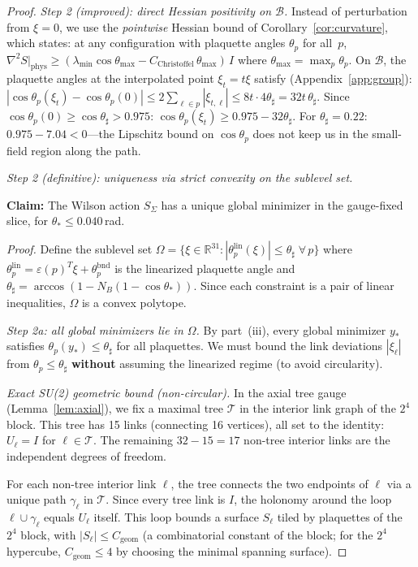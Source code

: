 \documentclass[11pt]{article}
\theoremstyle{definition}
\newcommand{\R}{\mathbb{R}}
\begin{document}
\begin{proof}
\emph{Step 2 (improved): direct Hessian positivity on $\mathcal{B}$.}
Instead of perturbation from $\xi=0$, we use the
\emph{pointwise} Hessian bound of Corollary~\ref{cor:curvature},
which states: at any configuration with plaquette angles
$\theta_p$ for all~$p$,
$\nabla^2 S|_{\mathrm{phys}}
\ge(\lambda_{\min}\cos\theta_{\max}
-C_{\mathrm{Christoffel}}\,\theta_{\max})\,I$
where $\theta_{\max}=\max_p\theta_p$.
On $\mathcal{B}$, the plaquette angles at the interpolated point
$\xi_t=t\xi$ satisfy (Appendix~\ref{app:group}):
$|\cos\theta_p(\xi_t)-\cos\theta_p(0)|
\le 2\sum_{\ell\in p}|\xi_{t,\ell}|
\le 8t\cdot 4\theta_\sharp=32t\,\theta_\sharp$.
Since $\cos\theta_p(0)\ge\cos\theta_\sharp>0.975$:
$\cos\theta_p(\xi_t)\ge 0.975-32\theta_\sharp$.
For $\theta_\sharp=0.22$: $0.975-7.04<0$---the Lipschitz bound on
$\cos\theta_p$ does not keep us in the small-field region
along the path.

\emph{Step 2 (definitive): uniqueness via strict convexity
on the sublevel set.}

\textbf{Claim:} The Wilson action $S_\Sigma$ has a unique
global minimizer in the gauge-fixed slice, for
$\theta_*\le 0.040$\,rad.

\textit{Proof.}
Define the sublevel set
$\Omega=\{\xi\in\R^{31}:|\theta_p^{\mathrm{lin}}(\xi)|
\le\theta_\sharp\;\forall\,p\}$
where $\theta_p^{\mathrm{lin}}=\varepsilon(p)^T\xi+\theta_p^{\mathrm{bnd}}$
is the linearized plaquette angle and
$\theta_\sharp=\arccos(1-N_B(1-\cos\theta_*))$.
Since each constraint is a pair of linear inequalities,
$\Omega$ is a convex polytope.

\emph{Step 2a: all global minimizers lie in $\Omega$.}
By part~(iii), every global minimizer $y_*$ satisfies
$\theta_p(y_*)\le\theta_\sharp$ for all plaquettes.
We must bound the link deviations $|\xi_\ell|$ from
$\theta_p\le\theta_\sharp$ \textbf{without} assuming
the linearized regime (to avoid circularity).

\emph{Exact SU(2) geometric bound (non-circular).}
In the axial tree gauge (Lemma~\ref{lem:axial}),
we fix a maximal tree $\mathcal{T}$ in the interior link
graph of the $2^4$ block.  This tree has 15 links
(connecting 16 vertices), all set to the identity:
$U_{\ell}=I$ for $\ell\in\mathcal{T}$.
The remaining $32-15=17$ non-tree interior links
are the independent degrees of freedom.

For each non-tree interior link $\ell$, the tree
connects the two endpoints of $\ell$ via a unique path
$\gamma_\ell$ in $\mathcal{T}$.  Since every tree link
is $I$, the holonomy around the loop
$\ell\cup\gamma_\ell$ equals $U_\ell$ itself.
This loop bounds a surface $S_\ell$ tiled by plaquettes
of the $2^4$ block, with $|S_\ell|\le C_{\mathrm{geom}}$
(a combinatorial constant of the block; for the $2^4$
hypercube, $C_{\mathrm{geom}}\le 4$ by choosing the
minimal spanning surface).


\end{proof}
\end{document}
